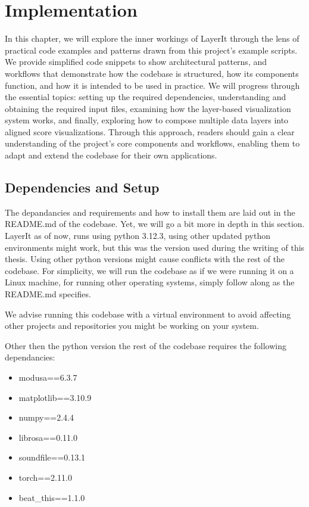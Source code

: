 \chapter{Implementation}\label{chap:chap4}
In this chapter, we will explore the inner workings of LayerIt through the lens of practical code examples and patterns drawn from this project's example scripts. We provide simplified code snippets to show architectural patterns, and workflows that demonstrate how the codebase is structured, how its components function, and how it is intended to be used in practice. We will progress through the essential topics: setting up the required dependencies, understanding and obtaining the required input files, examining how the layer-based visualization system works, and finally, exploring how to compose multiple data layers into aligned score visualizations. Through this approach, readers should gain a clear understanding of the project's core components and workflows, enabling them to adapt and extend the codebase for their own applications.

\section{Dependencies and Setup}
The depandancies and requirements and how to install them are laid out in the README.md of the codebase. Yet, we will go a bit more in depth in this section. LayerIt as of now, runs using python 3.12.3, using other updated python environments might work, but this was the version used during the writing of this thesis. Using other python versions might cause conflicts with the rest of the codebase. For simplicity, we will run the codebase as if we were running it on a Linux machine, for running other operating systems, simply follow along as the README.md specifies. 

\noindent We advise running this codebase with a virtual environment to avoid affecting other projects and repositories you might be working on your system.

\noindent Other then the python version the rest of the codebase requires the following dependancies:
\begin{itemize}
    \item modusa==6.3.7
    \item matplotlib==3.10.9
    \item numpy==2.4.4
    \item librosa==0.11.0
    \item soundfile==0.13.1
    \item torch==2.11.0
    \item beat\_this==1.1.0
\end{itemize}

